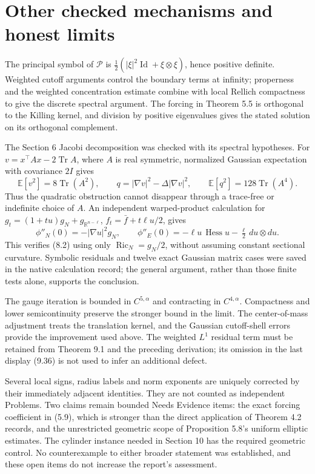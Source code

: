 \documentclass[10pt]{article}
\begin{document}
\section*{Other checked mechanisms and honest limits}
The principal symbol of \(\mathcal P\) is \(\tfrac12(|\xi|^2\operatorname{Id}+\xi\otimes\xi)\), hence positive definite. Weighted cutoff arguments control the boundary terms at infinity; properness and the weighted concentration estimate combine with local Rellich compactness to give the discrete spectral argument. The forcing in Theorem 5.5 is orthogonal to the Killing kernel, and division by positive eigenvalues gives the stated solution on its orthogonal complement.\par
The Section 6 Jacobi decomposition was checked with its spectral hypotheses. For \(v=x^{\top}Ax-2\operatorname{Tr}A\), where \(A\) is real symmetric, normalized Gaussian expectation with covariance \(2I\) gives \[\mathbb E[v^2]=8\operatorname{Tr}(A^2),\qquad
 q=|\nabla v|^2-\Delta|\nabla v|^2,\qquad
 \mathbb E[q^2]=128\operatorname{Tr}(A^4).\] Thus the quadratic obstruction cannot disappear through a trace-free or indefinite choice of \(A\). An independent warped-product calculation for \(g_t=(1+tu)g_N+g_{\mathbb R^{n-\ell}}\), \(f_t=\bar f+t\ell u/2\), gives \[\phi''_N(0)=-|\nabla u|^2g_N,\qquad
 \phi''_E(0)=-\ell u\,\operatorname{Hess}u-\tfrac\ell2\,du\otimes du.\] This verifies (8.2) using only \(\operatorname{Ric}_N=g_N/2\), without assuming constant sectional curvature. Symbolic residuals and twelve exact Gaussian matrix cases were saved in the native calculation record; the general argument, rather than those finite tests alone, supports the conclusion.\par
The gauge iteration is bounded in \(C^{5,\alpha}\) and contracting in \(C^{4,\alpha}\). Compactness and lower semicontinuity preserve the stronger bound in the limit. The center-of-mass adjustment treats the translation kernel, and the Gaussian cutoff-shell errors provide the improvement used above. The weighted \(L^1\) residual term must be retained from Theorem 9.1 and the preceding derivation; its omission in the last display (9.36) is not used to infer an additional defect.\par
Several local signs, radius labels and norm exponents are uniquely corrected by their immediately adjacent identities. They are not counted as independent Problems. Two claims remain bounded Needs Evidence items: the exact forcing coefficient in (5.9), which is stronger than the direct application of Theorem 4.2 records, and the unrestricted geometric scope of Proposition 5.8’s uniform elliptic estimates. The cylinder instance needed in Section 10 has the required geometric control. No counterexample to either broader statement was established, and these open items do not increase the report’s assessment.\par
\end{document}
